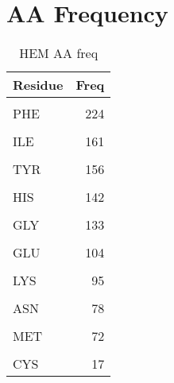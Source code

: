 \section{AA Frequency}
	
	\begin{table}
		\caption{HEM AA freq}
		\label{tbl:HEM_aaFreq}
		\centering
		\begin{tabular}{lr}
			\toprule
			Residue & Freq\\
			\midrule
			\cellcolor{gray!6}{LEU} & \cellcolor{gray!6}{261}\\
			PHE & 224\\
			\cellcolor{gray!6}{ALA} & \cellcolor{gray!6}{188}\\
			ILE & 161\\
			\cellcolor{gray!6}{VAL} & \cellcolor{gray!6}{158}\\
			\addlinespace
			TYR & 156\\
			\cellcolor{gray!6}{ARG} & \cellcolor{gray!6}{146}\\
			HIS & 142\\
			\cellcolor{gray!6}{THR} & \cellcolor{gray!6}{142}\\
			GLY & 133\\
			\addlinespace
			\cellcolor{gray!6}{SER} & \cellcolor{gray!6}{129}\\
			GLU & 104\\
			\cellcolor{gray!6}{ASP} & \cellcolor{gray!6}{99}\\
			LYS & 95\\
			\cellcolor{gray!6}{PRO} & \cellcolor{gray!6}{84}\\
			\addlinespace
			ASN & 78\\
			\cellcolor{gray!6}{GLN} & \cellcolor{gray!6}{78}\\
			MET & 72\\
			\cellcolor{gray!6}{TRP} & \cellcolor{gray!6}{60}\\
			CYS & 17\\
			\bottomrule
		\end{tabular}
	\end{table}


